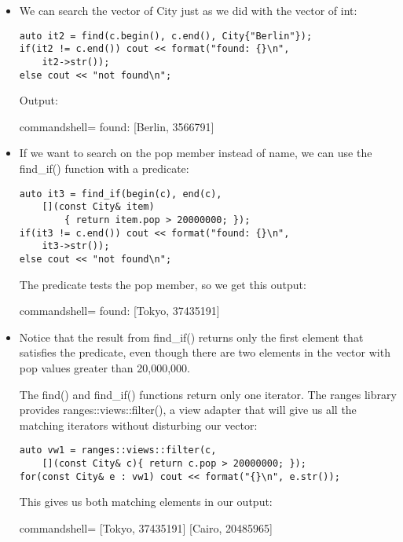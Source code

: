 \begin{itemize}
\item 
We can search the vector of City just as we did with the vector of int:

\begin{lstlisting}[style=styleCXX]
auto it2 = find(c.begin(), c.end(), City{"Berlin"});
if(it2 != c.end()) cout << format("found: {}\n",
	it2->str());
else cout << "not found\n";
\end{lstlisting}

Output:

\begin{tcblisting}{commandshell={}}
found: [Berlin, 3566791]
\end{tcblisting}

\item 
If we want to search on the pop member instead of name, we can use the find\_if() function with a predicate:

\begin{lstlisting}[style=styleCXX]
auto it3 = find_if(begin(c), end(c),
	[](const City& item)
		{ return item.pop > 20000000; });
if(it3 != c.end()) cout << format("found: {}\n",
	it3->str());
else cout << "not found\n";
\end{lstlisting}

The predicate tests the pop member, so we get this output:

\begin{tcblisting}{commandshell={}}
found: [Tokyo, 37435191]
\end{tcblisting}

\item 
Notice that the result from find\_if() returns only the first element that satisfies the predicate, even though there are two elements in the vector with pop values greater than 20,000,000.

The find() and find\_if() functions return only one iterator. The ranges library provides ranges::views::filter(), a view adapter that will give us all the matching iterators without disturbing our vector:

\begin{lstlisting}[style=styleCXX]
auto vw1 = ranges::views::filter(c,
	[](const City& c){ return c.pop > 20000000; });
for(const City& e : vw1) cout << format("{}\n", e.str());
\end{lstlisting}

This gives us both matching elements in our output:

\begin{tcblisting}{commandshell={}}
[Tokyo, 37435191]
[Cairo, 20485965]
\end{tcblisting}
\end{itemize}

